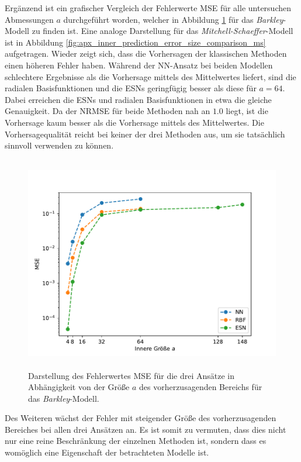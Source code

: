 Ergänzend ist ein grafischer Vergleich der Fehlerwerte MSE für alle untersuchen Abmessungen $a$ durchgeführt worden, welcher in Abbildung \ref{fig:inner_prediction_error_size_comparison_barkley} für das \textit{Barkley}-Modell zu finden ist. Eine analoge Darstellung für das \textit{Mitchell-Schaeffer}-Modell ist in Abbildung \ref{fig:apx_inner_prediction_error_size_comparison_ms} aufgetragen. Wieder zeigt sich, dass die Vorhersagen der klassischen Methoden einen höheren Fehler haben. Während der \textsc{NN}-Ansatz bei beiden Modellen schlechtere Ergebnisse als die Vorhersage mittels des Mittelwertes liefert, sind die radialen Basisfunktionen und die \textsc{ESN}s geringfügig besser als diese für $a=64$. Dabei erreichen die \textsc{ESN}s und radialen Basisfunktionen in etwa die gleiche Genauigkeit. Da der NRMSE für beide Methoden nah an $1.0$ liegt, ist die Vorhersage kaum besser als die Vorhersage mittels des Mittelwertes. Die Vorhersagequalität reicht bei keiner der drei Methoden aus, um sie tatsächlich sinnvoll verwenden zu können.

\begin{figure}[H]
	\centering
	\includegraphics[height=3.7in]{figures/results/inner_cross_prediction/barkley_error_size_comparison.pdf}
	\caption{Darstellung des Fehlerwertes MSE für die drei Ansätze in Abhängigkeit von der Größe $a$ des vorherzusagenden Bereichs für das \textit{Barkley}-Modell.}
	\label{fig:inner_prediction_error_size_comparison_barkley}
\end{figure}
 


Des Weiteren wächst der Fehler mit steigender Größe des vorherzusagenden Bereiches bei allen drei Ansätzen an. Es ist somit zu vermuten, dass dies nicht nur eine reine Beschränkung der einzelnen Methoden ist, sondern dass es womöglich eine Eigenschaft der betrachteten Modelle ist. \\

